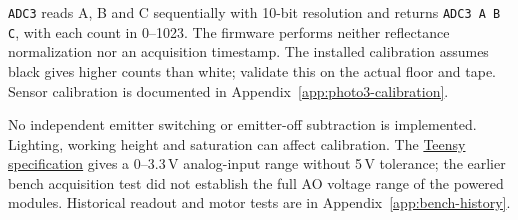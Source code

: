 \texttt{ADC3} reads A, B and C sequentially with 10-bit resolution and returns \texttt{ADC3 A B C}, with each count in 0--1023. The firmware performs neither reflectance normalization nor an acquisition timestamp. The installed calibration assumes black gives higher counts than white; validate this on the actual floor and tape. Sensor calibration is documented in Appendix~\ref{app:photo3-calibration}.

No independent emitter switching or emitter-off subtraction is implemented. Lighting, working height and saturation can affect calibration. The \href{https://www.pjrc.com/store/teensy41.html}{Teensy specification} gives a 0--3.3\,V analog-input range without 5\,V tolerance; the earlier bench acquisition test did not establish the full AO voltage range of the powered modules. Historical readout and motor tests are in Appendix~\ref{app:bench-history}.
